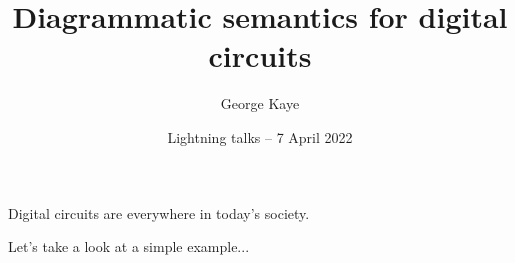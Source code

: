 \documentclass{beamer}
\title{Diagrammatic semantics for digital circuits}
\author{George Kaye}
\institute{University of Birmingham}
\date{Lightning talks -- 7 April 2022}
\begin{document}
    \maketitle
    \begin{frame}
        Digital circuits are \alert{everywhere} in today's society.

        \pause

        Let's take a look at a simple example...
    \end{frame}
    \begin{frame}
        \begin{center}
        \end{center}
    \end{frame}
    \begin{frame}
        \begin{center}
        \end{center}
    \end{frame}
    \begin{frame}
        \begin{center}
        \end{center}
    \end{frame}
    \begin{frame}
        \begin{center}
        \end{center}
    \end{frame}
    \begin{frame}
        \begin{center}
        \end{center}
    \end{frame}
    \begin{frame}
        \begin{center}
        \end{center}
    \end{frame}
    \begin{frame}
        \begin{center}
        \end{center}
    \end{frame}
\end{document}
